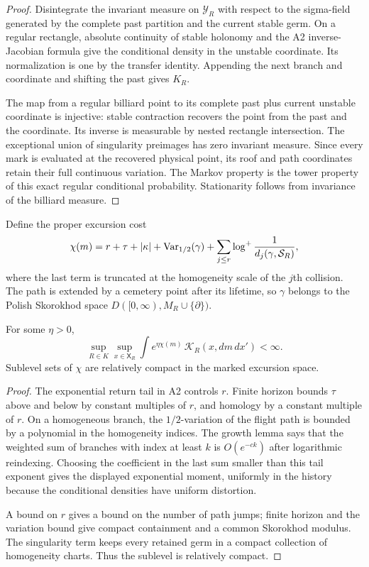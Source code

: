 \begin{proof}
Disintegrate the invariant measure on $\mathscr Y_R$ with respect to the
sigma-field generated by the complete past partition and the current stable
germ.  On a regular rectangle, absolute continuity of stable holonomy and the
A2 inverse-Jacobian formula give the conditional density in the unstable
coordinate.  Its normalization is one by the transfer identity.  Appending
the next branch and coordinate and shifting the past gives $K_R$.

The map from a regular billiard point to its complete past plus current
unstable coordinate is injective: stable contraction recovers the point from
the past and the coordinate.  Its inverse is measurable by nested rectangle
intersection.  The exceptional union of singularity preimages has zero
invariant measure.  Since every mark is evaluated at the recovered physical
point, its roof and path coordinates retain their full continuous variation.
The Markov property is the tower property of this exact regular conditional
probability.  Stationarity follows from invariance of the billiard measure.
\end{proof}

Define the proper excursion cost
\[
 \chi(m)=r+\tau+|\kappa|+
 \operatorname{Var}_{1/2}(\gamma)+
 \sum_{j\le r}\log^+{1\over d_j(\gamma,\mathcal S_R)},
\]
where the last term is truncated at the homogeneity scale of the $j$th
collision.  The path is extended by a cemetery point after its lifetime, so
$\gamma$ belongs to the Polish Skorokhod space
$D([0,\infty),M_R\cup\{\partial\})$.

\begin{lemma}
\label{lem:r21-a3-moment}
For some $\eta>0$,
\[
 \sup_{R\in K}\sup_{x\in\mathsf X_R}
 \int e^{\eta\chi(m)}\,\mathcal K_R(x,dm\,dx')<\infty .
\]
Sublevel sets of $\chi$ are relatively compact in the marked excursion
space.
\end{lemma}

\begin{proof}
The exponential return tail in A2 controls $r$.  Finite horizon bounds $\tau$
above and below by constant multiples of $r$, and homology by a constant
multiple of $r$.  On a homogeneous branch, the $1/2$-variation of the flight
path is bounded by a polynomial in the homogeneity indices.  The growth lemma
says that the weighted sum of branches with index at least $k$ is
$O(e^{-ck})$ after logarithmic reindexing.  Choosing the coefficient in the
last sum smaller than this tail exponent gives the displayed exponential
moment, uniformly in the history because the conditional densities have
uniform distortion.

A bound on $r$ gives a bound on the number of path jumps; finite horizon and
the variation bound give compact containment and a common Skorokhod modulus.
The singularity term keeps every retained germ in a compact collection of
homogeneity charts.  Thus the sublevel is relatively compact.
\end{proof}

